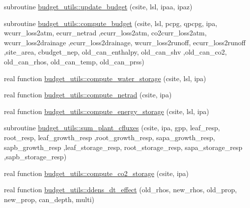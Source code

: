 \begin{DoxyCompactItemize}
\item 
subroutine \hyperlink{namespacebudget__utils_ad8835ee763cd964432b44e0a3d00e3da}{budget\+\_\+utils\+::update\+\_\+budget} (csite, lsl, ipaa, ipaz)
\item 
subroutine \hyperlink{namespacebudget__utils_ade80ff8e17018f7bd86015ee5f20375e}{budget\+\_\+utils\+::compute\+\_\+budget} (csite, lsl, pcpg, qpcpg, ipa, wcurr\+\_\+loss2atm, ecurr\+\_\+netrad                                                                                                                                               ,ecurr\+\_\+loss2atm, co2curr\+\_\+loss2atm, wcurr\+\_\+loss2drainage                                                                                                                                                   ,ecurr\+\_\+loss2drainage, wcurr\+\_\+loss2runoff, ecurr\+\_\+loss2runoff                                                                                                                                   ,site\+\_\+area, cbudget\+\_\+nep, old\+\_\+can\+\_\+enthalpy, old\+\_\+can\+\_\+shv                                                                                                                                                       ,old\+\_\+can\+\_\+co2, old\+\_\+can\+\_\+rhos, old\+\_\+can\+\_\+temp, old\+\_\+can\+\_\+prss)
\item 
real function \hyperlink{namespacebudget__utils_ad0c764047c557100b3a3cdcd836103a0}{budget\+\_\+utils\+::compute\+\_\+water\+\_\+storage} (csite, lsl, ipa)
\item 
real function \hyperlink{namespacebudget__utils_a6111a1c211ecef562368c8635f64af45}{budget\+\_\+utils\+::compute\+\_\+netrad} (csite, ipa)
\item 
real function \hyperlink{namespacebudget__utils_a319c5f7252c344bcebbd162593e25ec8}{budget\+\_\+utils\+::compute\+\_\+energy\+\_\+storage} (csite, lsl, ipa)
\item 
subroutine \hyperlink{namespacebudget__utils_a117874382f22a7cb0883681d23606828}{budget\+\_\+utils\+::sum\+\_\+plant\+\_\+cfluxes} (csite, ipa, gpp, leaf\+\_\+resp, root\+\_\+resp, leaf\+\_\+growth\+\_\+resp                                                                                                                                               ,root\+\_\+growth\+\_\+resp, sapa\+\_\+growth\+\_\+resp, sapb\+\_\+growth\+\_\+resp                                                                                                                                                       ,leaf\+\_\+storage\+\_\+resp, root\+\_\+storage\+\_\+resp, sapa\+\_\+storage\+\_\+resp                                                                                                                                           ,sapb\+\_\+storage\+\_\+resp)
\item 
real function \hyperlink{namespacebudget__utils_aa1c4f8466010b1673f2914f1bfe9b6ee}{budget\+\_\+utils\+::compute\+\_\+co2\+\_\+storage} (csite, ipa)
\item 
real function \hyperlink{namespacebudget__utils_ae7ad8d90c28490b0b1c920e7a2656345}{budget\+\_\+utils\+::ddens\+\_\+dt\+\_\+effect} (old\+\_\+rhos, new\+\_\+rhos, old\+\_\+prop, new\+\_\+prop, can\+\_\+depth, multi)
\end{DoxyCompactItemize}
